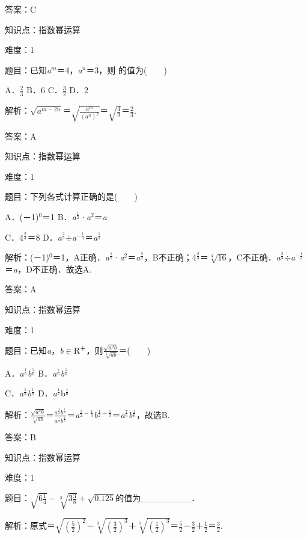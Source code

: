 \documentclass{article} %
\begin{document}
答案：C

知识点：指数幂运算

难度：1

题目：已知\textit{a${}^{m}$}＝4，\textit{a${}^{n}$}＝3，则 的值为(　　)

A．$\frac{2}{3}$  B．6  C．$\frac{3}{2}$  D．2

解析：$\sqrt{a^{m-2n}}$＝$\sqrt{\frac{a^{m}}{(a^{n})^{2}}}$＝$\sqrt{\frac{4}{9}}$＝$\frac{2}{3}$.

答案：A

知识点：指数幂运算

难度：1

题目：下列各式计算正确的是(　　)

A．(－1)${}^{0}$＝1   B．\textit{a}${}^{\frac{1}{2}}$·\textit{a}${}^{2}$＝\textit{a}

C．4$^{\frac{2}{3}}$＝8   D．\textit{a}${}^{\frac{2}{3}}$$\mathrm{\div}$\textit{a}${}^{{-}\frac{1}{3}}$＝\textit{a}${}^{\frac{1}{3}}$

解析：(－1)${}^{0}$＝1，A正确．\textit{a}${}^{\frac{1}{2}}$·\textit{a}${}^{2}$＝\textit{a}$^{\frac{5}{2}}$，B不正确；4${}^{\frac{2}{3}}$＝$\sqrt[3]{16}$，C不正确．\textit{a}${}^{\frac{2}{3}}$$\mathrm{\div}$\textit{a}${}^{{-}\frac{1}{3}}$＝\textit{a}，D不正确．故选A.

答案：A

知识点：指数幂运算

难度：1

题目：已知\textit{a}，\textit{b}$\mathrm{\in}$R${}^{\textrm{＋}}$，则$\frac{\sqrt{a^{3}b}}{\sqrt[3]{ab}}$＝(　　)

A．\textit{a}${}^{\frac{1}{6}}$\textit{b}${}^{\frac{7}{6}}$   B．\textit{a}${}^{\frac{7}{6}}$\textit{b}${}^{\frac{1}{6}}$

C．\textit{a}${}^{\frac{1}{3}}$\textit{b}${}^{\frac{1}{6}}$   D．\textit{a}${}^{\frac{1}{2}}$b$^{\frac{1}{6}}$

解析：$\frac{\sqrt{a^{3}b}}{\sqrt[3]{ab}}$＝$\frac{a^{\frac{3}{2}}b^{\frac{1}{2}}}{a^{\frac{1}{3}}b^{\frac{1}{3}}}$＝\textit{a}${}^{\frac{3}{2}-\frac{1}{3}}$\textit{b}${}^{\frac{1}{2}-\frac{1}{3}}$＝\textit{a}${}^{\frac{7}{6}}$\textit{b}${}^{\frac{1}{6}}$，故选B.

答案：B

知识点：指数幂运算

难度：1

题目：$\sqrt{6\frac{1}{4}}-\sqrt[3]{3\frac{3}{8}}+\sqrt{0.125}$的值为\_\_\_\_\_\_\_\_．

解析：原式＝$\sqrt{(\frac{5}{2})^{2}}$－$\sqrt[3]{(\frac{3}{2})^{3}}$＋$\sqrt[3]{(\frac{1}{2})^{3}}$＝$\frac{5}{2}$－$\frac{3}{2}$＋$\frac{1}{2}$＝$\frac{3}{2}$.
\end{document}
